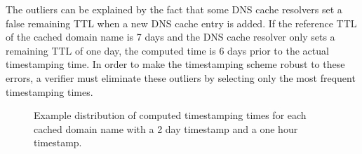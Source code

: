 The outliers can be explained by the fact that some DNS cache resolvers set a false remaining TTL when a new DNS cache entry is added. If the reference TTL of the cached domain name is 7 days and the DNS cache resolver only sets a remaining TTL of one day, the computed time is 6 days prior to the actual timestamping time.
In order to make the timestamping scheme robust to these errors, a verifier must eliminate these outliers by selecting only the most frequent timestamping times.


\begin{figure*}
\begin{center}
\caption{Example distribution of computed timestamping times for each cached domain name with  a 2 day timestamp and  a one hour timestamp.}
\end{center}
\end{figure*}